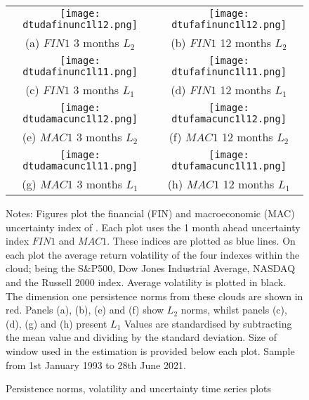 \documentclass{article}
\begin{document}
\begin{figure}
    \begin{center}
        \caption{Persistence norms, volatility and uncertainty time series plots}
        \label{fig:unc2}
        \begin{tabular}{c c}
            \texttt{[image: dtudafinunc1l12.png]} & \texttt{[image: dtufafinunc1l12.png]}  \\
            (a) $FIN1$  3 months $L_2$ & (b) $FIN1$ 12 months $L_2$ \\ 
            \texttt{[image: dtudafinunc1l11.png]} & \texttt{[image: dtufafinunc1l11.png]}  \\
            (c) $FIN1$  3 months  $L_1$& (d) $FIN1$ 12 months  $L_1$\\ 
            \texttt{[image: dtudamacunc1l12.png]} & \texttt{[image: dtufamacunc1l12.png]}  \\
            (e) $MAC1$ 3 months $L_2$ & (f) $MAC1$ 12 months $L_2$  \\
            \texttt{[image: dtudamacunc1l11.png]} & \texttt{[image: dtufamacunc1l11.png]}  \\
            (g) $MAC1$ 3 months $L_1$ & (h) $MAC1$ 12 months $L_1$ \\
        \end{tabular}
    \end{center}
\footnotesize{Notes: Figures plot the financial (FIN) and macroeconomic (MAC) uncertainty index of \cite{jurado2015measuring}. Each plot uses the 1 month ahead uncertainty index $FIN1$ and $MAC1$. These indices are plotted as blue lines. On each plot the average return volatility of the four indexes within the cloud; being the S\&P500, Dow Jones Industrial Average, NASDAQ and the Russell 2000 index. Average volatility is plotted in black. The dimension one persistence norms from these clouds are shown in red. Panels (a), (b), (e) and (f) show $L_2$ norms, whilst panels (c), (d), (g) and (h) present $L_1$ Values are standardised by subtracting the mean value and dividing by the standard deviation. Size of window used in the estimation is provided below each plot. Sample from 1st January 1993 to 28th June 2021.}
\end{figure}
\end{document}
